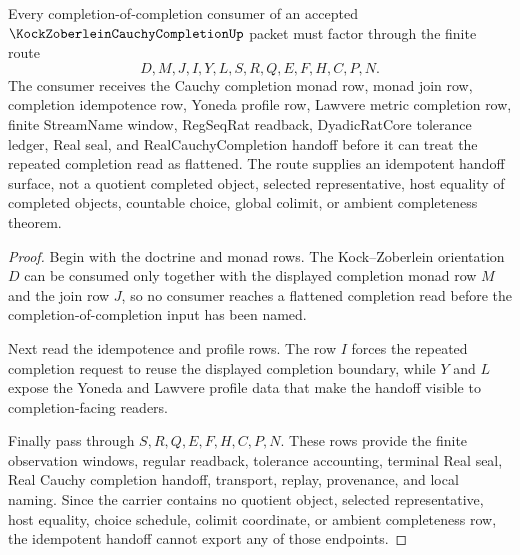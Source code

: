 \begin{theorem}
\label{thm:kock-zoberlein-cauchy-completion-idempotent-handoff}
Every completion-of-completion consumer of an accepted $\KockZoberleinCauchyCompletionUp$ packet must factor through the finite route
$$
D,M,J,I,Y,L,S,R,Q,E,F,H,C,P,N.
$$
The consumer receives the Cauchy completion monad row, monad join row, completion idempotence row, Yoneda profile row, Lawvere metric completion row, finite StreamName window, RegSeqRat readback, DyadicRatCore tolerance ledger, Real seal, and RealCauchyCompletion handoff before it can treat the repeated completion read as flattened. The route supplies an idempotent handoff surface, not a quotient completed object, selected representative, host equality of completed objects, countable choice, global colimit, or ambient completeness theorem.
\end{theorem}
\begin{proof}
Begin with the doctrine and monad rows. The Kock--Zoberlein orientation $D$ can be consumed only together with the displayed completion monad row $M$ and the join row $J$, so no consumer reaches a flattened completion read before the completion-of-completion input has been named.

Next read the idempotence and profile rows. The row $I$ forces the repeated completion request to reuse the displayed completion boundary, while $Y$ and $L$ expose the Yoneda and Lawvere profile data that make the handoff visible to completion-facing readers.

Finally pass through $S,R,Q,E,F,H,C,P,N$. These rows provide the finite observation windows, regular readback, tolerance accounting, terminal Real seal, Real Cauchy completion handoff, transport, replay, provenance, and local naming. Since the carrier contains no quotient object, selected representative, host equality, choice schedule, colimit coordinate, or ambient completeness row, the idempotent handoff cannot export any of those endpoints.
\end{proof}



